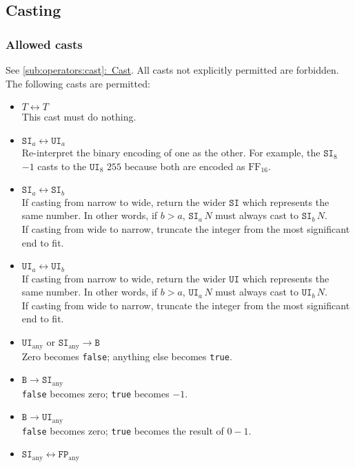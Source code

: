\documentclass{article}
\newcommand{\R}[1]{\mathtt{#1}}
\newcommand{\both}{\leftrightarrow}
\newcommand{\textref}[2]{\hyperref[#1]{\underline{\ref*{#1}:~#2}}}
\begin{document}
\subsection{Casting}
\label{sub:types:casting}
\subsubsection{Allowed casts}
See \textref{sub:operators:cast}{Cast}.
All casts not explicitly permitted are forbidden. The following casts are
permitted:
\begin{itemize}
  \item{$T \both T$ \\
    This cast must do nothing.}
  \item{$\R{SI}_a \both \R{UI}_a$ \\
    Re-interpret the binary encoding of one as the other. For example,
    the $\R{SI}_8$ $-1$ casts to the $\R{UI}_8$ $255$ because both are
    encoded as $\mathrm{FF}_{16}$.}
  \item{$\R{SI}_a \both \R{SI}_b$ \\
    If casting from narrow to wide, return the wider $\R{SI}$ which represents
    the same number. In other words, if $b > a$, $\R{SI}_a\,N$ must always cast
    to $\R{SI}_b\,N$. \\
    If casting from wide to narrow, truncate the integer from the most
    significant end to fit.}
  \item{$\R{UI}_a \both \R{UI}_b$ \\
    If casting from narrow to wide, return the wider $\R{UI}$ which represents
    the same number. In other words, if $b > a$, $\R{UI}_a\,N$ must always cast
    to $\R{UI}_b\,N$. \\
    If casting from wide to narrow, truncate the integer from the most
    significant end to fit.}
  \item{$\R{UI}_\mathrm{any} \textrm{ or } \R{SI}_\mathrm{any} \to \R{B}$ \\
    Zero becomes \texttt{false}; anything else becomes \texttt{true}.}
  \item{$\R{B} \to \R{SI}_\mathrm{any}$ \\
    \texttt{false} becomes zero; \texttt{true} becomes $-1$.}
  \item{$\R{B} \to \R{UI}_\mathrm{any}$ \\
    \texttt{false} becomes zero; \texttt{true} becomes the result of $0 - 1$.}
  \item{$\R{SI}_\mathrm{any} \both \R{FP}_\mathrm{any}$ \\
}
\end{itemize}
\end{document}
